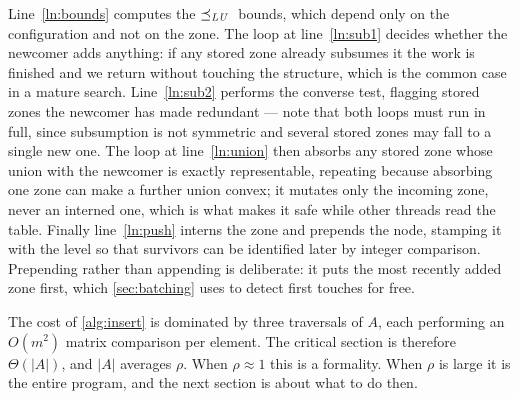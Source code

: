 Line~\ref{ln:bounds} computes the $\preceq_{\mathit{LU}}{}$ bounds, which depend only on the configuration and
not on the zone. The loop at line~\ref{ln:sub1} decides whether the newcomer adds anything: if
any stored zone already subsumes it the work is finished and we return without touching the
structure, which is the common case in a mature search. Line~\ref{ln:sub2} performs the
converse test, flagging stored zones the newcomer has made redundant --- note that both loops
must run in full, since subsumption is not symmetric and several stored zones may fall to a
single new one. The loop at line~\ref{ln:union} then absorbs any stored zone whose union with
the newcomer is exactly representable, repeating because absorbing one zone can make a further
union convex; it mutates only the incoming zone, never an interned one, which is what makes it
safe while other threads read the table. Finally line~\ref{ln:push} interns the zone and
prepends the node, stamping it with the level so that survivors can be identified later by
integer comparison. Prepending rather than appending is deliberate: it puts the most recently
added zone first, which \cref{sec:batching} uses to detect first touches for free.

The cost of \cref{alg:insert} is dominated by three traversals of $A$, each performing an
$O(m^2)$ matrix comparison per element. The critical section is therefore $\Theta(|A|)$, and
$|A|$ averages $\rho$. When $\rho \approx 1$ this is a formality. When $\rho$ is large it is
the entire program, and the next section is about what to do then.
